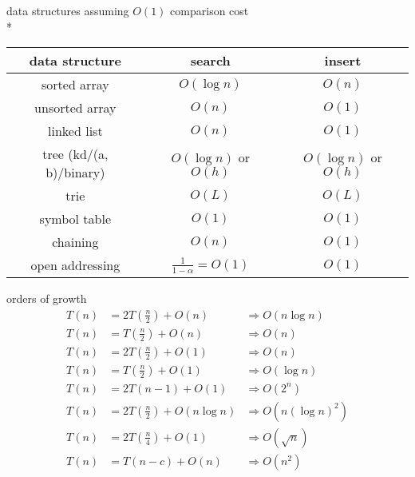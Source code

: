 \documentclass{article}
\newenvironment{tightcenter}{%
  \setlength\topsep{0pt}
  \setlength\parskip{0pt}
  \begin{center}
}{%
  \end{center}
}
\begin{document}
\begin{multicols}{2}
\begin{tightcenter}
        data structures assuming $O(1)$ comparison cost
        \\* \begin{tabular}{| c | c | c |}\hline
            \textbf{data structure} & \textbf{search}             & \textbf{insert}       \\\hline
            sorted array            & $O(\log n)$                 & $O(n)$                \\\hline
            unsorted array          & $O(n)$                      & $O(1)$                \\\hline
            linked list             & $O(n)$                      & $O(1)$                \\\hline
            tree (kd/(a, b)/binary) & $O(\log n)$ or $O(h)$       & $O(\log n)$ or $O(h)$ \\\hline
            trie                    & $O(L)$                      & $O(L)$                \\\hline
            symbol table            & $O(1)$                      & $O(1)$                \\\hline
            chaining                & $O(n)$                      & $O(1)$                \\\hline
            open addressing         & $\frac{1}{1-\alpha} = O(1)$ & $O(1)$                \\\hline
        \end{tabular}

        orders of growth
        \begin{align*}
            T(n) & = 2T(\frac{n}{2}) + O(n) & \Rightarrow O(n \log n)
            \\ T(n) &= T(\frac{n}{2}) + O(n) &\Rightarrow O(n)
            \\ T(n) &= 2T(\frac{n}{2}) + O(1) &\Rightarrow O(n)
            \\ T(n) &= T(\frac{n}{2}) + O(1) &\Rightarrow O(\log n)
            \\ T(n) &= 2T(n - 1) + O(1) &\Rightarrow O(2^n)
            \\ T(n) &= 2T(\frac{n}{2}) + O(n \log n) &\Rightarrow O(n(\log n)^2)
            \\ T(n) &= 2T(\frac{n}{4}) + O(1) &\Rightarrow O(\sqrt{n})
            \\ T(n) &= T(n - c) + O(n) &\Rightarrow O(n^2)
        \end{align*}
    \end{tightcenter}
\end{multicols}
\end{document}
